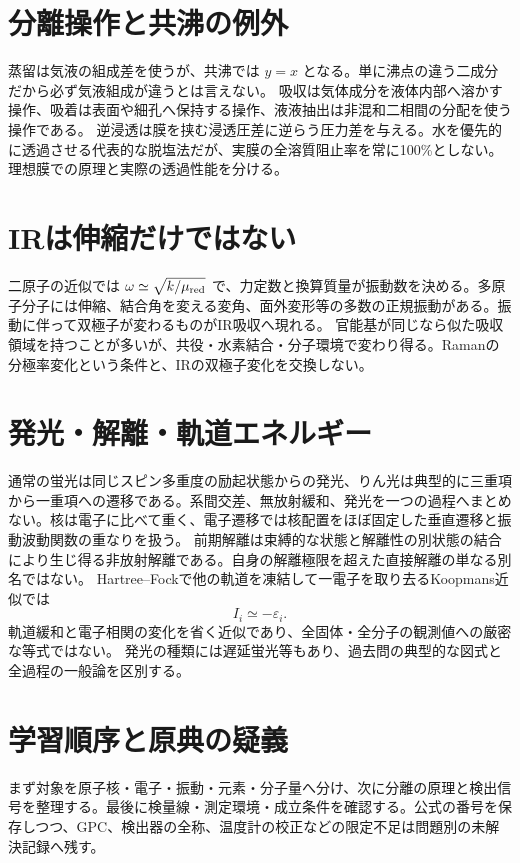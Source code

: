 \section{分離操作と共沸の例外}\label{theory:analysis:operations}
蒸留は気液の組成差を使うが、共沸では \(y=x\) となる。単に沸点の違う二成分だから必ず気液組成が違うとは言えない\cite{nptel_azeotrope}。
吸収は気体成分を液体内部へ溶かす操作、吸着は表面や細孔へ保持する操作、液液抽出は非混和二相間の分配を使う操作である。
逆浸透は膜を挟む浸透圧差に逆らう圧力差を与える。水を優先的に透過させる代表的な脱塩法だが、実膜の全溶質阻止率を常に100\%としない。理想膜での原理と実際の透過性能を分ける。

\section{IRは伸縮だけではない}\label{theory:analysis:ir}
二原子の近似では \(\omega\simeq\sqrt{k/\mu_{\rm red}}\) で、力定数と換算質量が振動数を決める。多原子分子には伸縮、結合角を変える変角、面外変形等の多数の正規振動がある。振動に伴って双極子が変わるものがIR吸収へ現れる\cite{analysis49_ir_ref,atomic_ir_raman}。
官能基が同じなら似た吸収領域を持つことが多いが、共役・水素結合・分子環境で変わり得る。Ramanの分極率変化という条件と、IRの双極子変化を交換しない。

\section{発光・解離・軌道エネルギー}\label{theory:analysis:photophysics}
通常の蛍光は同じスピン多重度の励起状態からの発光、りん光は典型的に三重項から一重項への遷移である。系間交差、無放射緩和、発光を一つの過程へまとめない。核は電子に比べて重く、電子遷移では核配置をほぼ固定した垂直遷移と振動波動関数の重なりを扱う。
前期解離は束縛的な状態と解離性の別状態の結合により生じ得る非放射解離である。自身の解離極限を超えた直接解離の単なる別名ではない\cite{analysis49_pred_ref}。
Hartree--Fockで他の軌道を凍結して一電子を取り去るKoopmans近似では
\[
 I_i\simeq-\varepsilon_i.
\]
軌道緩和と電子相関の変化を省く近似であり、全固体・全分子の観測値への厳密な等式ではない\cite{analysis49_koop_ref}。
発光の種類には遅延蛍光等もあり、過去問の典型的な図式と全過程の一般論を区別する。

\section{学習順序と原典の疑義}
まず対象を原子核・電子・振動・元素・分子量へ分け、次に分離の原理と検出信号を整理する。最後に検量線・測定環境・成立条件を確認する。公式の番号を保存しつつ、GPC、検出器の全称、温度計の校正などの限定不足は問題別の未解決記録へ残す。
